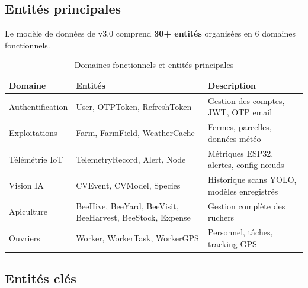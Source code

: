 \subsection{Entités principales}

Le modèle de données de \farmAI{} v3.0 comprend \textbf{30+ entités} organisées en
6 domaines fonctionnels.

\begin{table}[H]
\centering
\caption{Domaines fonctionnels et entités principales}
\label{tab:domains}
\begin{tabular}{lll}
\toprule
\textbf{Domaine} & \textbf{Entités} & \textbf{Description} \\
\midrule
Authentification & User, OTPToken, RefreshToken &
  Gestion des comptes, JWT, OTP email \\
Exploitations    & Farm, FarmField, WeatherCache &
  Fermes, parcelles, données météo \\
Télémétrie IoT   & TelemetryRecord, Alert, Node &
  Métriques ESP32, alertes, config nœuds \\
Vision IA        & CVEvent, CVModel, Species &
  Historique scans YOLO, modèles enregistrés \\
Apiculture       & BeeHive, BeeYard, BeeVisit,\newline
                   BeeHarvest, BeeStock, Expense &
  Gestion complète des ruchers \\
Ouvriers         & Worker, WorkerTask, WorkerGPS &
  Personnel, tâches, tracking GPS \\
\bottomrule
\end{tabular}
\end{table}

\subsection{Entités clés}

